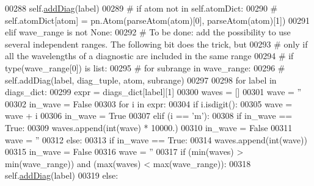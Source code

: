 \begin{DoxyCode}
00288                     self.\hyperlink{classpyneb_1_1core_1_1diags_1_1_diagnostics_a508fa9c5a2216f9eb4128338c33a6f75}{addDiag}(label)
00289 \textcolor{comment}{#                    if atom not in self.atomDict:}
00290 \textcolor{comment}{#                        self.atomDict[atom] = pn.Atom(parseAtom(atom)[0], parseAtom(atom)[1])}
00291         \textcolor{keywordflow}{elif} wave\_range \textcolor{keywordflow}{is} \textcolor{keywordflow}{not} \textcolor{keywordtype}{None}:
00292 \textcolor{comment}{# To be done: add the possibility to use several independent ranges. The following bit does the trick, but}
00293 \textcolor{comment}{# only if all the wavelengths of a diagnostic are included in the same range}
00294 \textcolor{comment}{#            if type(wave\_range[0]) is list:}
00295 \textcolor{comment}{#                for subrange in wave\_range:}
00296 \textcolor{comment}{#                    self.addDiag(label, diag\_tuple, atom, subrange)}
00297                  
00298             \textcolor{keywordflow}{for} label \textcolor{keywordflow}{in} diags\_dict:
00299                 expr = diags\_dict[label][1]
00300                 waves = []
00301                 wave = \textcolor{stringliteral}{''}
00302                 in\_wave = \textcolor{keyword}{False}
00303                 \textcolor{keywordflow}{for} i \textcolor{keywordflow}{in} expr:
00304                     \textcolor{keywordflow}{if} i.isdigit():
00305                         wave = wave + i
00306                         in\_wave = \textcolor{keyword}{True}
00307                     \textcolor{keywordflow}{elif} (i == \textcolor{stringliteral}{'m'}):
00308                         \textcolor{keywordflow}{if} in\_wave == \textcolor{keyword}{True}:
00309                             waves.append(int(wave) * 10000.)
00310                             in\_wave = \textcolor{keyword}{False}
00311                             wave = \textcolor{stringliteral}{''}
00312                     \textcolor{keywordflow}{else}:
00313                         \textcolor{keywordflow}{if} in\_wave == \textcolor{keyword}{True}:
00314                             waves.append(int(wave))
00315                             in\_wave = \textcolor{keyword}{False}
00316                             wave = \textcolor{stringliteral}{''}
00317                 \textcolor{keywordflow}{if} (min(waves) > min(wave\_range)) \textcolor{keywordflow}{and} (max(waves) < max(wave\_range)):
00318                     self.\hyperlink{classpyneb_1_1core_1_1diags_1_1_diagnostics_a508fa9c5a2216f9eb4128338c33a6f75}{addDiag}(label)
00319         \textcolor{keywordflow}{else}:

\end{DoxyCode}
